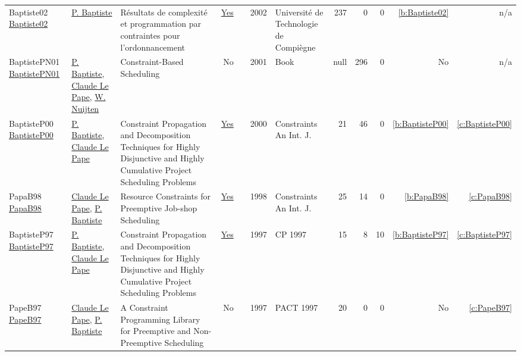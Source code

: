 {\begin{longtable}{>{\raggedright\arraybackslash}p{3cm}>{\raggedright\arraybackslash}p{6cm}>{\raggedright\arraybackslash}p{6.5cm}rrrp{2.5cm}rrrrr}
Baptiste02 \href{https://theses.hal.science/tel-00124998}{Baptiste02} & \hyperref[auth:a164]{P. Baptiste} & {R{\'e}sultats de complexit{\'e} et programmation par contraintes pour l'ordonnancement} & \href{works/Baptiste02.pdf}{Yes} & \cite{Baptiste02} & 2002 & {Universit{\'e} de Technologie de Compi{\`e}gne} & 237 & 0 & 0 & \ref{b:Baptiste02} & n/a\\
BaptistePN01 \href{http://dx.doi.org/10.1007/978-1-4615-1479-4}{BaptistePN01} & \hyperref[auth:a164]{P. Baptiste}, \hyperref[auth:a165]{Claude Le Pape}, \hyperref[auth:a666]{W. Nuijten} & Constraint-Based Scheduling & No & \cite{BaptistePN01} & 2001 & Book & null & 296 & 0 & No & n/a\\
BaptisteP00 \href{https://doi.org/10.1023/A:1009822502231}{BaptisteP00} & \hyperref[auth:a164]{P. Baptiste}, \hyperref[auth:a165]{Claude Le Pape} & Constraint Propagation and Decomposition Techniques for Highly Disjunctive and Highly Cumulative Project Scheduling Problems & \href{works/BaptisteP00.pdf}{Yes} & \cite{BaptisteP00} & 2000 & Constraints An Int. J. & 21 & 46 & 0 & \ref{b:BaptisteP00} & \ref{c:BaptisteP00}\\
PapaB98 \href{https://doi.org/10.1023/A:1009723704757}{PapaB98} & \hyperref[auth:a165]{Claude Le Pape}, \hyperref[auth:a164]{P. Baptiste} & Resource Constraints for Preemptive Job-shop Scheduling & \href{works/PapaB98.pdf}{Yes} & \cite{PapaB98} & 1998 & Constraints An Int. J. & 25 & 14 & 0 & \ref{b:PapaB98} & \ref{c:PapaB98}\\
BaptisteP97 \href{https://doi.org/10.1007/BFb0017454}{BaptisteP97} & \hyperref[auth:a164]{P. Baptiste}, \hyperref[auth:a165]{Claude Le Pape} & Constraint Propagation and Decomposition Techniques for Highly Disjunctive and Highly Cumulative Project Scheduling Problems & \href{works/BaptisteP97.pdf}{Yes} & \cite{BaptisteP97} & 1997 & CP 1997 & 15 & 8 & 10 & \ref{b:BaptisteP97} & \ref{c:BaptisteP97}\\
PapeB97 \href{}{PapeB97} & \hyperref[auth:a165]{Claude Le Pape}, \hyperref[auth:a164]{P. Baptiste} & A Constraint Programming Library for Preemptive and Non-Preemptive Scheduling & No & \cite{PapeB97} & 1997 & PACT 1997 & 20 & 0 & 0 & No & \ref{c:PapeB97}\\
\end{longtable}
}

